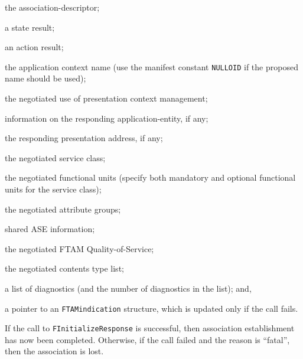\begin{describe}
\item[\verb"sd":] the association-descriptor;

\item[\verb"state":] a state result;

\item[\verb"action":] an action result;

\item[\verb"context":] the application context name
(use the manifest constant \verb"NULLOID" if the proposed name should be used);

\item[\verb"manage":] the negotiated use of presentation context management;

\item[\verb"respondtitle":] information on the responding application-entity,
if any;

\item[\verb"respondaddr":] the responding presentation address, if any;

\item[\verb"manage":] the negotiated service class;

\item[\verb"units":] the negotiated functional units
(specify both mandatory and optional functional units for the service class);

\item[\verb"attrs":] the negotiated attribute groups;

\item[\verb"sharedASE":] shared ASE information;

\item[\verb"fqos":] the negotiated FTAM Quality-of-Service;

\item[\verb"contents":] the negotiated contents type list;

\item[\verb"diag"/\verb"ndiag":] a list of diagnostics
(and the number of diagnostics in the list);
and,

\item[\verb"fti":] a pointer to an \verb"FTAMindication" structure,
which is updated only if the call fails.
\end{describe}
If the call to \verb"FInitializeResponse" is successful,
then association establishment has now been completed.
Otherwise,
if the call failed and the reason is ``fatal'',
then the association is lost.

